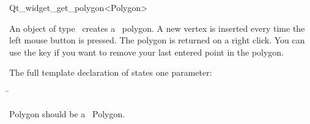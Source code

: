 
\begin{ccRefClass}{Qt_widget_get_polygon<Polygon>}

\ccDefinition
An object of type \ccRefName\ creates a \cgal\ polygon. A new 
vertex is inserted every time the left mouse button is pressed.
The polygon is returned on a right click. You can use the 
key if you want to remove your last entered point in the polygon.



\ccParameters

The full template declaration of  states one parameter:

\begin{tabbing}
 \=\\
\end{tabbing}

Polygon should be a \cgal\ Polygon.

\ccInheritsFrom
{}

\ccGlue

\ccCreation
{}


\end{ccRefClass}









